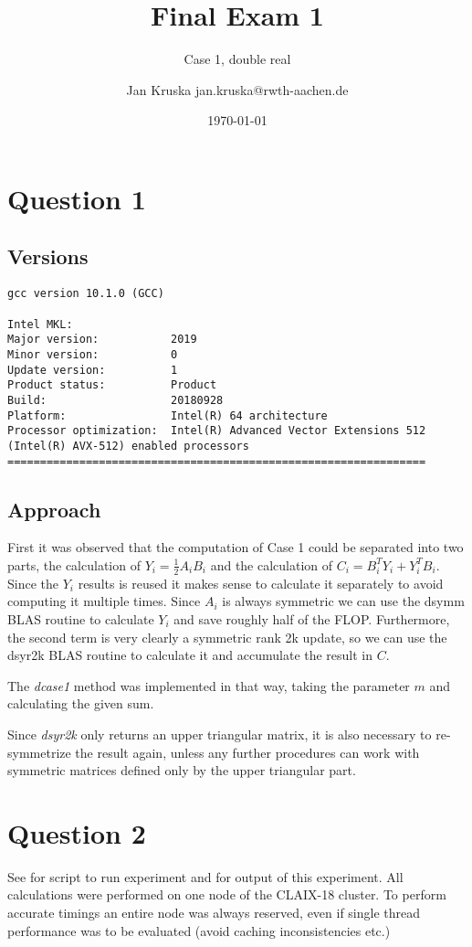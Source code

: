 \documentclass{scrartcl}
\title{Final Exam 1}
\subtitle{Case 1, double real}
\author{Jan Kruska jan.kruska@rwth-aachen.de}
\date{\today}
\begin{document}
\maketitle


\section{Question 1}
\subsection{Versions}
\begin{verbatim}
gcc version 10.1.0 (GCC)

Intel MKL:
Major version:           2019
Minor version:           0
Update version:          1
Product status:          Product
Build:                   20180928
Platform:                Intel(R) 64 architecture
Processor optimization:  Intel(R) Advanced Vector Extensions 512 (Intel(R) AVX-512) enabled processors
================================================================
\end{verbatim}

\subsection{Approach}

First it was observed that the computation of Case 1 could be separated into two parts, the calculation of $Y_i = \frac{1}{2}A_iB_i$ and the calculation of $C_i = B_i^TY_i + Y_i^TB_i$.
Since the $Y_i$ results is reused it makes sense to calculate it separately to avoid computing it multiple times.
Since $A_i$ is always symmetric we can use the dsymm BLAS routine to calculate $Y_i$ and save roughly half of the FLOP.
Furthermore, the second term is very clearly a symmetric rank 2k update, so we can use the dsyr2k BLAS routine to calculate it and accumulate the result in $C$.

The \emph{dcase1} method was implemented in that way, taking the parameter $m$ and calculating the given sum.

Since \emph{dsyr2k} only returns an upper triangular matrix, it is also necessary to re-symmetrize the result again, unless any further procedures can work with symmetric matrices defined only by the upper triangular part.

\section{Question 2}
See  for script to run experiment and  for output of this experiment.
All calculations were performed on one node of the CLAIX-18 cluster.
To perform accurate timings an entire node was always reserved, even if single thread performance was to be evaluated (avoid caching inconsistencies etc.)
\end{document}
